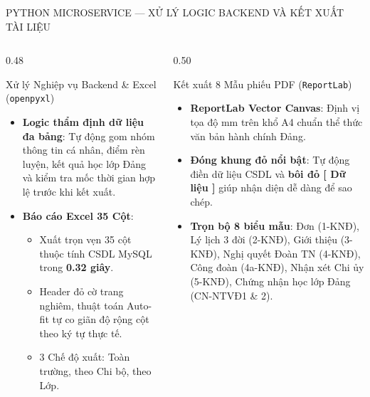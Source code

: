 \documentclass[aspectratio=169, 10pt]{beamer}
\begin{document}
\begin{frame}{PYTHON MICROSERVICE — XỬ LÝ LOGIC BACKEND VÀ KẾT XUẤT TÀI LIỆU}
  \begin{columns}[T]
    \begin{column}{0.48\textwidth}
      \begin{highlightCard}{Xử lý Nghiệp vụ Backend \& Excel (\texttt{openpyxl})}
        \fontsize{6.6pt}{8.1pt}\selectfont
        \begin{itemize}
          \setlength{\itemsep}{1.2pt}
          \item \textbf{Logic thẩm định dữ liệu đa bảng}: Tự động gom nhóm thông tin cá nhân, điểm rèn luyện, kết quả học lớp Đảng và kiểm tra mốc thời gian hợp lệ trước khi kết xuất.
          \item \textbf{Báo cáo Excel 35 Cột}:
                \begin{itemize}
                  \item Xuất trọn vẹn 35 cột thuộc tính CSDL MySQL trong \textbf{0.32 giây}.
                  \item Header đỏ cờ trang nghiêm, thuật toán Auto-fit tự co giãn độ rộng cột theo ký tự thực tế.
                  \item 3 Chế độ xuất: Toàn trường, theo Chi bộ, theo Lớp.
                \end{itemize}
        \end{itemize}
      \end{highlightCard}
    \end{column}
    \begin{column}{0.50\textwidth}
      \begin{greenCard}{Kết xuất 8 Mẫu phiếu PDF (\texttt{ReportLab})}
        \fontsize{6.4pt}{7.8pt}\selectfont
        \begin{itemize}
          \setlength{\itemsep}{0.8pt}
          \item \textbf{ReportLab Vector Canvas}: Định vị tọa độ mm trên khổ A4 chuẩn thể thức văn bản hành chính Đảng.
          \item \textbf{Đóng khung đỏ nổi bật}: Tự động điền dữ liệu CSDL và \textbf{\color{PartyRed}bôi đỏ [ Dữ liệu ]} giúp nhận diện dễ dàng để sao chép.
          \item \textbf{Trọn bộ 8 biểu mẫu}: Đơn (1-KNĐ), Lý lịch 3 đời (2-KNĐ), Giới thiệu (3-KNĐ), Nghị quyết Đoàn TN (4-KNĐ), Công đoàn (4a-KNĐ), Nhận xét Chi ủy (5-KNĐ), Chứng nhận học lớp Đảng (CN-NTVĐ1 \& 2).
        \end{itemize}
      \end{greenCard}
    \end{column}
  \end{columns}
\end{frame}
\end{document}
